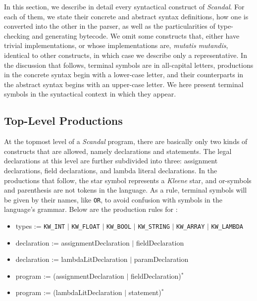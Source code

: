 In this section, we describe in detail every syntactical construct of \emph{Scandal}. For each of them, we state their concrete and abstract syntax definitions, how one is converted into the other in the parser, as well as the particularities of type-checking and generating bytecode. We omit some constructs that, either have trivial implementations, or whose implementations are, \emph{mutatis mutandis}, identical to other constructs, in which case we describe only a representative. In the discussion that follows, terminal symbols are in all-capital letters, productions in the concrete syntax begin with a lower-case letter, and their counterparts in the abstract syntax begins with an upper-case letter. We here present terminal symbols in the syntactical context in which they appear. %

\subsection{Top-Level Productions}

At the topmost level of a \emph{Scandal} program, there are basically only two kinds of constructs that are allowed, namely declarations and statements. The legal declarations at this level are further subdivided into three: assignment declarations, field declarations, and lambda literal declarations. In the productions that follow, the star symbol represents a \emph{Kleene} star, and or-symbols and parenthesis are not tokens in the language. As a rule, terminal symbols will be given by their names, like \texttt{OR}, to avoid confusion with symbols in the language's grammar. Below are the production rules for :

\begin{itemize}
	\item types := \texttt{KW\_INT} $|$ \texttt{KW\_FLOAT} $|$ \texttt{KW\_BOOL} $|$ \texttt{KW\_STRING} $|$ \texttt{KW\_ARRAY} $|$ \texttt{KW\_LAMBDA}
	\item declaration := assignmentDeclaration $|$ fieldDeclaration
	\item declaration := lambdaLitDeclaration $|$ paramDeclaration
	\item program := (assignmentDeclaration $|$ fieldDeclaration)$^*$
	\item program := (lambdaLitDeclaration $|$ statement)$^*$
\end{itemize}

